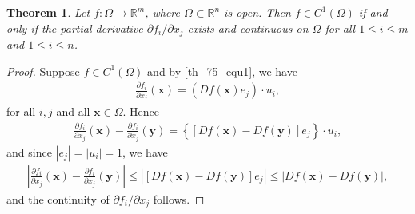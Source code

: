 \documentclass[11pt]{book}
\newtheorem{theorem}{Theorem}[chapter]
\theoremstyle{definition}
\numberwithin{equation}{chapter}
\begin{document}
\begin{theorem}
Let $f: \Omega \to \mathbb{R}^m$, where $\Omega \subset \mathbb{R}^n$ is open. Then $f \in C^1(\Omega)$ if and only if the partial derivative $\partial f_i/\partial x_j$ exists and continuous on $\Omega$ for all $1 \leq i \leq m$ and $1 \leq i \leq n$.
\end{theorem}
\begin{proof}
Suppose $f \in C^1(\Omega)$ and by \eqref{th_75_equ1}, we have
\begin{align*}
    \frac{\partial f_i}{\partial x_j}(\mathbf{x}) = \left(Df(\mathbf{x}) e_j\right) \cdot u_i,
\end{align*}
for all $i,j$ and all $\mathbf{x} \in \Omega$. Hence 
\begin{align*}
    \frac{\partial f_i}{\partial x_j}(\mathbf{x}) - \frac{\partial f_i}{\partial x_j}(\mathbf{y}) = \left\{[Df(\mathbf{x}) - Df(\mathbf{y})] e_j\right\} \cdot u_i,
\end{align*}
and since $\left|e_j\right| = \left|u_i\right| = 1$, we have
\begin{align*}
    \left|\frac{\partial f_i}{\partial x_j}(\mathbf{x}) - \frac{\partial f_i}{\partial x_j}(\mathbf{y})\right| \leq \left|[Df(\mathbf{x}) - Df(\mathbf{y})] e_j\right| \leq \left|Df(\mathbf{x}) - Df(\mathbf{y})\right|,
\end{align*}
and the continuity of $\partial f_i/\partial x_j$ follows.


\end{proof}
\end{document}

